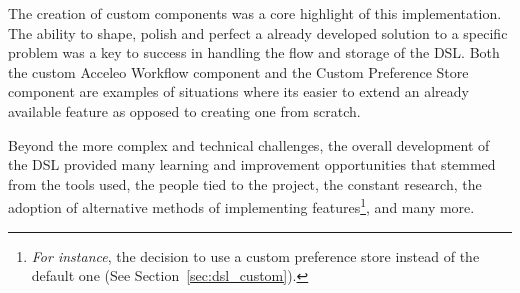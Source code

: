 The creation of custom components was a core highlight of this implementation. The ability to shape, polish and perfect a already developed solution to a specific problem was a key to success in handling the flow and storage of the \gls{DSL}. Both the custom Acceleo Workflow component and the Custom Preference Store component are examples of situations where its easier to extend an already available feature as opposed to creating one from scratch.

Beyond the more complex and technical challenges, the overall development of the \gls{DSL} provided many learning and improvement opportunities that stemmed from the tools used, the people tied to the project, the constant research, the adoption of alternative methods of implementing features\footnote{\textit{For instance}, the decision to use a custom preference store instead of the default one (See Section~\ref{sec:dsl_custom}).}, and many more.





